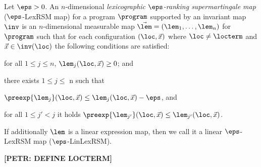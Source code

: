 \begin{definition}
Let $\eps>0$. An $n$-dimensional \emph{lexicographic $\eps$-ranking supermartingale map} ($\eps$-LexRSM map) for a program $\program$ supported by an invariant map $\inv$ is an $n$-dimensional measurable map $\vec{\lem}=(\lem_1,\dots,\lem_n)$ for $\program$ such that for each configuration $(\loc,\vec{x})$ where $\loc\neq \locterm$ and $\vec{x}\in \inv(\loc)$ the following conditions are satisfied:
 \begin{compactitem}
 	\item
 	for all $1\leq j \leq n$, $\lem_j(\loc,\vec{x})\geq 0$; and
 	\item 
 	there exists $1\leq j \leq$ n such that
 	\begin{compactitem}
 	\item
 	$\preexp{\lem_j}(\loc,\vec{x}) \leq \lem_j(\loc,\vec{x})-\eps$, and
 	\item
 	for all $1\leq j'<j$ it holds 
 	$\preexp{\lem_{j'}}(\loc,\vec{x}) \leq \lem_{j'}(\loc,\vec{x})$.
 	\end{compactitem}
 \end{compactitem}
If additionally $\lem$ is a linear expression map, then we call it a linear $\eps$-LexRSM map ($\eps$-LinLexRSM).
\end{definition}

\textbf{[PETR: DEFINE LOCTERM]}



